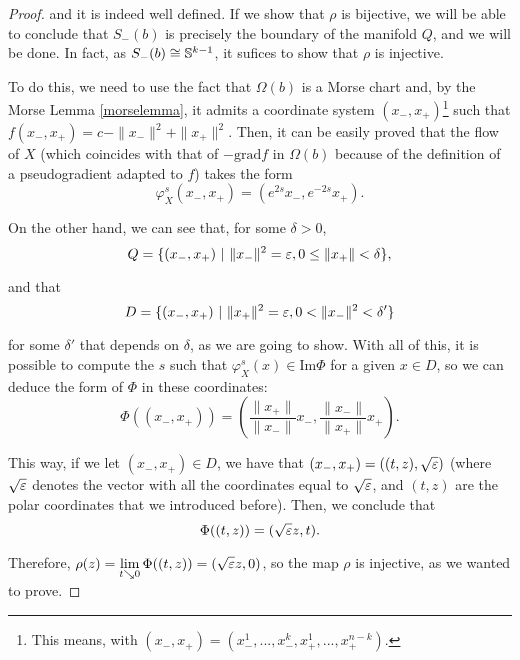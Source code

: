\begin{proof}
and it is indeed well defined. If we show that $\rho$ is bijective, we will be able to conclude that $S_-(b)$ is precisely the boundary of the manifold $Q$, and we will be done. In fact, as $S_-(b) \cong \mathbb{S}^{k-1}$, it sufices to show that $\rho$ is injective.

To do this, we need to use the fact that $\Omega(b)$ is a Morse chart and, by the Morse Lemma \ref{morselemma}, it admits a coordinate system $(x_-,x_+)$\footnote{This means, with $(x_-,x_+)=(x_-^1,...,x_-^k,x_+^1,...,x_+^{n-k})$.} such that $f(x_-,x_+) = c - \|x_-\|^2 + \|x_+\|^2$. Then, it can be easily proved that the flow of $X$ (which coincides with that of $-\text{grad}f$ in $\Omega(b)$ because of the definition of a pseudogradient adapted to $f$) takes the form
$$\varphi_X^s(x_-,x_+) = (e^{2s}x_-,e^{-2s}x_+) .$$

On the other hand, we can see that, for some $\delta > 0$,
$$Q = \{(x_-,x_+) \ | \ \|x_-\|^2 = \varepsilon, 0 \leq \|x_+\| < \delta\}, $$

and that
$$D = \{(x_-,x_+) \ | \ \|x_+\|^2 = \varepsilon, 0 < \|x_-\|^2 < \delta' \}$$

for some $\delta'$ that depends on $\delta$, as we are going to show. With all of this, it is possible to compute the $s$ such that $\varphi_X^s(x) \in \text{Im}\Phi$ for a given $x \in D$, so we can deduce the form of $\Phi$ in these coordinates:
\[\Phi((x_-,x_+)) = \left(\frac{\|x_+\|}{\|x_-\|} x_-, \frac{\|x_-\|}{\|x_+\|} x_+\right) .\]

This way, if we let $(x_-,x_+) \in D$, we have that $(x_-,x_+) = ((t,z), \sqrt{\varepsilon})$ (where $\sqrt{\varepsilon}$ denotes the vector with all the coordinates equal to $\sqrt{\varepsilon}$, and $(t,z)$ are the polar coordinates that we introduced before). Then, we conclude that
\[\Phi((t,z)) = (\sqrt{\varepsilon} z, t) .\]

Therefore, $\rho(z) = \displaystyle\lim_{t \searrow 0} \Phi((t,z)) = (\sqrt{\varepsilon} z, 0)$, so the map $\rho$ is injective, as we wanted to prove.
\end{proof}
